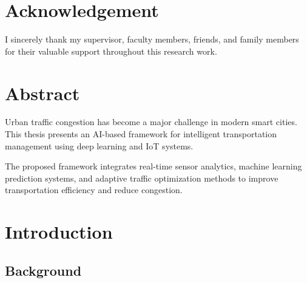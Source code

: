 \documentclass[12pt,a4paper]{report}
\begin{document}
	
	\chapter*{Acknowledgement}
	
	I sincerely thank my supervisor, faculty members, friends, and family members for their valuable support throughout this research work.
	
	\newpage
	
	
	\chapter*{Abstract}
	
	Urban traffic congestion has become a major challenge in modern smart cities. This thesis presents an AI-based framework for intelligent transportation management using deep learning and IoT systems.
	
	The proposed framework integrates real-time sensor analytics, machine learning prediction systems, and adaptive traffic optimization methods to improve transportation efficiency and reduce congestion.
	
	\newpage
	
	
	\tableofcontents
	
	\newpage
	
	\listoftables
	
	\newpage
	
	\listoffigures
	
	\newpage
	
	
	\chapter{Introduction}
	
	\section{Background}
	
\end{document}
